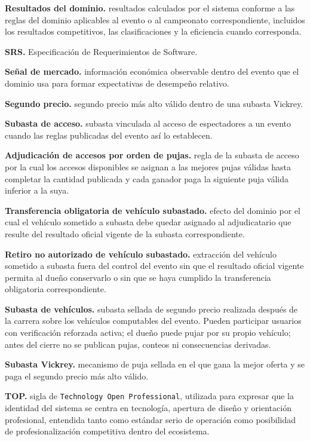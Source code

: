 \documentclass[10pt,letterpaper]{article}
\begin{document}
\noindent\textbf{Resultados del dominio.} resultados calculados por el sistema conforme a las reglas del dominio aplicables al evento o al campeonato correspondiente, incluidos los resultados competitivos, las clasificaciones y la eficiencia cuando corresponda.\par
\noindent\textbf{SRS.} Especificación de Requerimientos de Software.\par
\noindent\textbf{Señal de mercado.} información económica observable dentro del evento que el dominio usa para formar expectativas de desempeño relativo.\par
\noindent\textbf{Segundo precio.} segundo precio más alto válido dentro de una subasta Vickrey.\par
\noindent\textbf{Subasta de acceso.} subasta vinculada al acceso de espectadores a un evento cuando las reglas publicadas del evento así lo establecen.\par
\noindent\textbf{Adjudicación de accesos por orden de pujas.} regla de la subasta de acceso por la cual los accesos disponibles se asignan a las mejores pujas válidas hasta completar la cantidad publicada y cada ganador paga la siguiente puja válida inferior a la suya.\par
\noindent\textbf{Transferencia obligatoria de vehículo subastado.} efecto del dominio por el cual el vehículo sometido a subasta debe quedar asignado al adjudicatario que resulte del resultado oficial vigente de la subasta correspondiente.\par
\noindent\textbf{Retiro no autorizado de vehículo subastado.} extracción del vehículo sometido a subasta fuera del control del evento sin que el resultado oficial vigente permita al dueño conservarlo o sin que se haya cumplido la transferencia obligatoria correspondiente.\par
\noindent\textbf{Subasta de vehículos.} subasta sellada de segundo precio realizada después de la carrera sobre los vehículos computables del evento. Pueden participar usuarios con verificación reforzada activa; el dueño puede pujar por su propio vehículo; antes del cierre no se publican pujas, conteos ni consecuencias derivadas.\par
\noindent\textbf{Subasta Vickrey.} mecanismo de puja sellada en el que gana la mejor oferta y se paga el segundo precio más alto válido.\par
\noindent\textbf{TOP.} sigla de \texttt{Technology Open Professional}, utilizada para expresar que la identidad del sistema se centra en tecnología, apertura de diseño y orientación profesional, entendida tanto como estándar serio de operación como posibilidad de profesionalización competitiva dentro del ecosistema.\par
\end{document}
